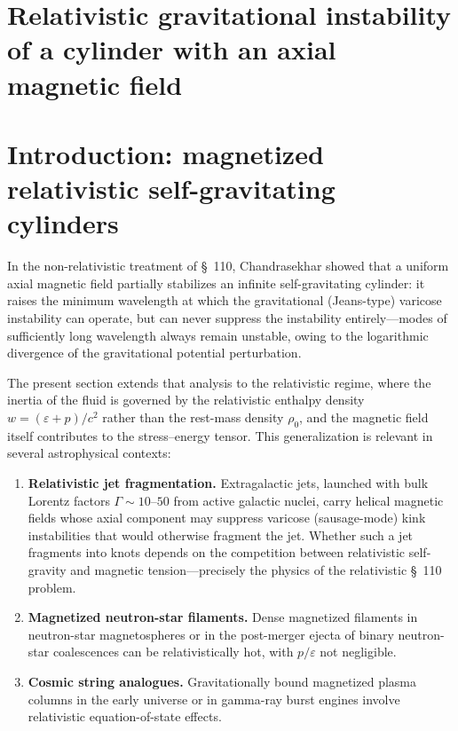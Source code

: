 
\section{Relativistic gravitational instability of a cylinder with an axial magnetic field}
\label{sec:rel-12-110}

\section{Introduction: magnetized relativistic self-gravitating cylinders}
\label{sec:rel-12-110-intro}

In the non-relativistic treatment of \S~110, Chandrasekhar showed that
a uniform axial magnetic field partially stabilizes an infinite
self-gravitating cylinder: it raises the minimum wavelength at which
the gravitational (Jeans-type) varicose instability can operate, but
can never suppress the instability entirely---modes of sufficiently
long wavelength always remain unstable, owing to the logarithmic
divergence of the gravitational potential perturbation.

The present section extends that analysis to the relativistic regime,
where the inertia of the fluid is governed by the relativistic
enthalpy density $w = (\varepsilon + p)/c^{2}$ rather than the
rest-mass density $\rho_{0}$, and the magnetic field itself
contributes to the stress--energy tensor.  This generalization is
relevant in several astrophysical contexts:

\begin{enumerate}
\item \textbf{Relativistic jet fragmentation.}  Extragalactic jets,
  launched with bulk Lorentz factors $\Gamma \sim 10$--$50$ from
  active galactic nuclei, carry helical magnetic fields whose axial
  component may suppress varicose (sausage-mode) kink instabilities
  that would otherwise fragment the jet.  Whether such a jet fragments
  into knots depends on the competition between relativistic
  self-gravity and magnetic tension---precisely the physics of the
  relativistic \S~110 problem.
\item \textbf{Magnetized neutron-star filaments.}  Dense magnetized
  filaments in neutron-star magnetospheres or in the post-merger
  ejecta of binary neutron-star coalescences can be relativistically
  hot, with $p/\varepsilon$ not negligible.
\item \textbf{Cosmic string analogues.}  Gravitationally bound
  magnetized plasma columns in the early universe or in gamma-ray
  burst engines involve relativistic equation-of-state effects.
\end{enumerate}

